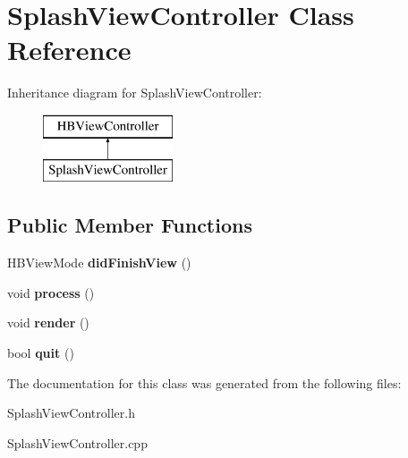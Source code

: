 \hypertarget{class_splash_view_controller}{\section{Splash\-View\-Controller Class Reference}
\label{class_splash_view_controller}
}
Inheritance diagram for Splash\-View\-Controller\-:\begin{figure}[H]
\begin{center}
\leavevmode
\includegraphics[height=2.000000cm]{class_splash_view_controller}
\end{center}
\end{figure}
\subsection*{Public Member Functions}
\begin{DoxyCompactItemize}
\item 
\hypertarget{class_splash_view_controller_aa537448267eb12a016f733dc029017ed}{H\-B\-View\-Mode {\bfseries did\-Finish\-View} ()}\label{class_splash_view_controller_aa537448267eb12a016f733dc029017ed}

\item 
\hypertarget{class_splash_view_controller_aca5b5fc1f60391ac72d1f2a31a7e13b5}{void {\bfseries process} ()}\label{class_splash_view_controller_aca5b5fc1f60391ac72d1f2a31a7e13b5}

\item 
\hypertarget{class_splash_view_controller_a2940ddcc3675b8e9f5b1902c8c176d3f}{void {\bfseries render} ()}\label{class_splash_view_controller_a2940ddcc3675b8e9f5b1902c8c176d3f}

\item 
\hypertarget{class_splash_view_controller_a9b0d10569eefc088ac627207f18db974}{bool {\bfseries quit} ()}\label{class_splash_view_controller_a9b0d10569eefc088ac627207f18db974}

\end{DoxyCompactItemize}


The documentation for this class was generated from the following files\-:\begin{DoxyCompactItemize}
\item 
Splash\-View\-Controller.\-h\item 
Splash\-View\-Controller.\-cpp\end{DoxyCompactItemize}
